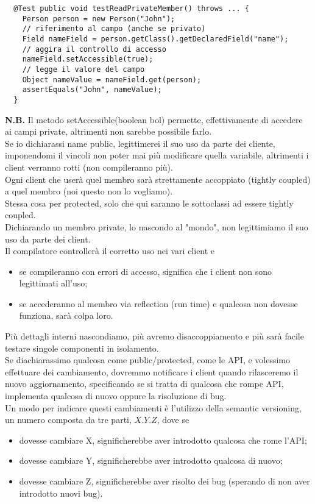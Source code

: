 \begin{lstlisting}
  @Test public void testReadPrivateMember() throws ... {
    Person person = new Person("John");
    // riferimento al campo (anche se privato)
    Field nameField = person.getClass().getDeclaredField("name");
    // aggira il controllo di accesso
    nameField.setAccessible(true);
    // legge il valore del campo
    Object nameValue = nameField.get(person);
    assertEquals("John", nameValue);
  }
\end{lstlisting}

\textbf{N.B.} Il metodo setAccessible(boolean bol) permette, effettivamente di accedere ai campi private, altrimenti non sarebbe possibile farlo.\\
Se io dichiarassi name public, legittimerei il suo uso da parte dei cliente, imponendomi il vincoli non poter mai più modificare quella variabile, altrimenti i client verranno rotti (non compileranno più).\\
Ogni client che userà quel membro sarà strettamente accoppiato (tightly coupled) a quel membro (noi questo non lo vogliamo).\\
Stessa cosa per protected, solo che qui saranno le sottoclassi ad essere tightly coupled.\\
Dichiarando un membro private, lo nascondo al "mondo", non legittimiamo il suo uso da parte dei client.\\
Il compilatore controllerà il corretto uso nei vari client e

\begin{itemize}
  \item se compileranno con errori di accesso, significa che i client non sono legittimati all’uso;
  \item se accederanno al membro via reflection (run time) e qualcosa non dovesse funziona, sarà colpa loro. 
\end{itemize} 

Più dettagli interni nascondiamo, più avremo disaccoppiamento e più sarà facile testare singole componenti in isolamento.\\
Se diachiarassimo qualcosa come public/protected, come le API, e volessimo effettuare dei cambiamento, dovremmo notificare i client quando rilasceremo il nuovo aggiornamento, specificando se si tratta di qualcosa che rompe API, implementa qualcosa di nuovo oppure la risoluzione di bug.\\
Un modo per indicare questi cambiamenti è l'utilizzo della semantic versioning, un numero composta da tre parti, $X.Y.Z$, dove se

\begin{itemize}
  \item dovesse cambiare X, significherebbe aver introdotto qualcosa che rome l'API;
  \item dovesse cambiare Y, significherebbe aver introdotto qualcosa di nuovo;
  \item dovesse cambiare Z, significherebbe aver risolto dei bug (sperando di non aver introdotto nuovi bug).
\end{itemize}